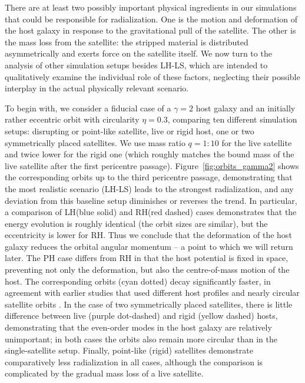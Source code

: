 \documentclass[twocolumn]{aastex63}
\newcommand{\LH}{\textsf{L\!H}\xspace}
\newcommand{\RH}{\textsf{R\!H}\xspace}
\newcommand{\PH}{\textsf{P\!H}\xspace}
\newcommand{\LS}{\textsf{L\!S}\xspace}
\begin{document}
There are at least two possibly important physical ingredients in our simulations that could be responsible for radialization. One is the motion and deformation of the host galaxy in response to the gravitational pull of the satellite. The other is the mass loss from the satellite: the stripped material is distributed asymmetrically and exerts force on the satellite itself. We now turn to the analysis of other simulation setups besides \LH-\LS, which are intended to qualitatively examine the individual role of these factors, neglecting their possible interplay in the actual physically relevant scenario.

To begin with, we consider a fiducial case of a $\gamma=2$ host galaxy and an initially rather eccentric orbit with circularity $\eta=0.3$, comparing ten different simulation setups: disrupting or point-like satellite, live or rigid host, one or two symmetrically placed satellites. We use mass ratio $q=1:10$ for the live satellite and twice lower for the rigid one (which roughly matches the bound mass of the live satellite after the first pericentre passage). Figure~\ref{fig:orbits_gamma2} shows the corresponding orbits up to the third pericentre passage, demonstrating that the most realistic scenario (\LH-\LS) leads to the strongest radialization, and any deviation from this baseline setup diminishes or reverses the trend. In particular, a comparison of \LH (blue solid) and \RH (red dashed) cases demonstrates that the energy evolution is roughly identical (the orbit sizes are similar), but the eccentricity is lower for \RH. Thus we conclude that the deformation of the host galaxy reduces the orbital angular momentum -- a point to which we will return later. The \PH case differs from \RH in that the host potential is fixed in space, preventing not only the deformation, but also the centre-of-mass motion of the host. The corresponding orbits (cyan dotted) decay significantly faster, in agreement with earlier studies that used different host profiles and nearly circular satellite orbits \citep{White1983,Zaritsky1988,Hernquist1989}. In the case of two symmetrically placed satellites, there is little difference between live (purple dot-dashed) and rigid (yellow dashed) hosts, demonstrating that the even-order modes in the host galaxy are relatively unimportant; in both cases the orbits also remain more circular than in the single-satellite setup. Finally, point-like (rigid) satellites demonstrate comparatively less radialization in all cases, although the comparison is complicated by the gradual mass loss of a live satellite.
\end{document}
